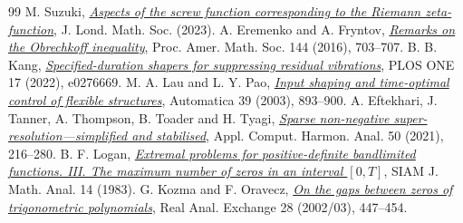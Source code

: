 \documentclass[11pt,letterpaper]{article}
\theoremstyle{remark}\newtheorem{remark}[theorem]{Remark}
\begin{document}
\begin{thebibliography}{99}
 M. Suzuki, \href{https://doi.org/10.1112/jlms.12785}{\emph{Aspects of the screw function corresponding to the Riemann zeta-function}}, J. Lond. Math. Soc. (2023).
 A. Eremenko and A. Fryntov, \href{https://arxiv.org/abs/1409.4849}{\emph{Remarks on the Obrechkoff inequality}}, Proc. Amer. Math. Soc. 144 (2016), 703--707.
 B. B. Kang, \href{https://doi.org/10.1371/journal.pone.0276669}{\emph{Specified-duration shapers for suppressing residual vibrations}}, PLOS ONE 17 (2022), e0276669.
 M. A. Lau and L. Y. Pao, \href{https://doi.org/10.1016/S0005-1098(03)00024-4}{\emph{Input shaping and time-optimal control of flexible structures}}, Automatica 39 (2003), 893--900.
 A. Eftekhari, J. Tanner, A. Thompson, B. Toader and H. Tyagi, \href{https://arxiv.org/abs/1804.01490}{\emph{Sparse non-negative super-resolution---simplified and stabilised}}, Appl. Comput. Harmon. Anal. 50 (2021), 216--280.
 B. F. Logan, \href{https://doi.org/10.1137/0514024}{\emph{Extremal problems for positive-definite bandlimited functions. III. The maximum number of zeros in an interval $[0,T]$}}, SIAM J. Math. Anal. 14 (1983).
 G. Kozma and F. Oravecz, \href{https://arxiv.org/abs/math/0601021}{\emph{On the gaps between zeros of trigonometric polynomials}}, Real Anal. Exchange 28 (2002/03), 447--454.
\end{thebibliography}
\end{document}

